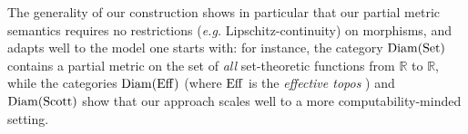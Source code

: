 The generality of our construction shows in particular that our partial metric semantics requires no restrictions (\textit{e.g.} Lipschitz-continuity) on morphisms, and adapts well to the model one starts with: for instance, the category $\operatorname{Diam}(\operatorname{Set})$ contains a partial metric on the set of \emph{all}  set-theoretic functions from $\mathbb R$ to $\mathbb R$, while the categories $\operatorname{Diam}(\operatorname{Eff})$ (where $\operatorname{Eff}$ is the \emph{effective topos} \cite{hyland:effective-topos}) and $\operatorname{Diam}(\operatorname{Scott})$ show that our approach scales well to a more computability-minded setting.




%
%
%      
%
%

